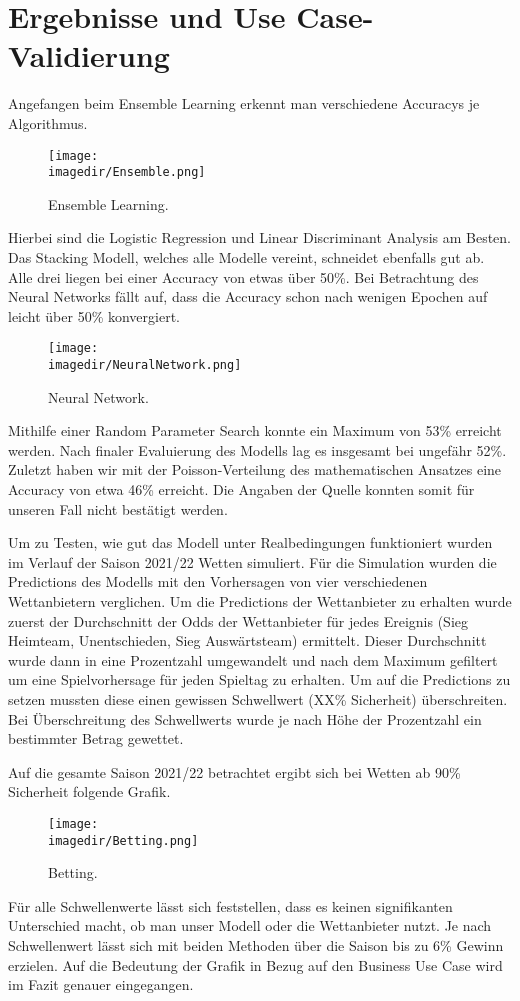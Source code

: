 \section{Ergebnisse und Use Case-Validierung}
Angefangen beim Ensemble Learning erkennt man verschiedene Accuracys je Algorithmus. 
\begin{figure}[H]
	
	\centering
	\texttt{[image: \\imagedir/Ensemble.png]}
	\captionsetup{format=hang}
	\caption[Ensemble Learning]{\label{fig:test}Ensemble Learning.}
	
\end{figure}
Hierbei sind die Logistic Regression und Linear Discriminant Analysis am Besten. Das Stacking Modell, welches alle Modelle vereint, schneidet ebenfalls gut ab. Alle drei liegen bei einer Accuracy von etwas über 50\%. Bei Betrachtung des Neural Networks fällt auf, dass die Accuracy schon nach wenigen Epochen auf leicht über 50\% konvergiert.
\begin{figure}[H]
	
	\centering
	\texttt{[image: \\imagedir/NeuralNetwork.png]}
	\captionsetup{format=hang}
	\caption[Neural Network]{\label{fig:test}Neural Network.}
	
\end{figure}
Mithilfe einer Random Parameter Search konnte ein Maximum von 53\% erreicht werden. Nach finaler Evaluierung des Modells lag es insgesamt bei ungefähr 52\%. Zuletzt haben wir mit der Poisson-Verteilung des mathematischen Ansatzes eine Accuracy von
etwa 46\% erreicht. Die Angaben der Quelle konnten somit für unseren Fall nicht bestätigt werden.

Um zu Testen, wie gut das Modell unter Realbedingungen funktioniert
wurden im Verlauf der Saison 2021/22 Wetten simuliert. Für die
Simulation wurden die Predictions des Modells mit den Vorhersagen von
vier verschiedenen Wettanbietern verglichen. Um die Predictions der
Wettanbieter zu erhalten wurde zuerst der Durchschnitt der Odds der
Wettanbieter für jedes Ereignis (Sieg Heimteam, Unentschieden, Sieg Auswärtsteam)
ermittelt. Dieser Durchschnitt wurde dann in eine Prozentzahl umgewandelt
und nach dem Maximum gefiltert um eine Spielvorhersage für jeden Spieltag zu erhalten.
Um auf die Predictions zu setzen mussten diese einen gewissen Schwellwert (XX\% Sicherheit) überschreiten.
Bei Überschreitung des Schwellwerts wurde je nach Höhe der Prozentzahl ein bestimmter Betrag gewettet.

Auf die gesamte Saison 2021/22 betrachtet ergibt sich bei Wetten ab 90\% Sicherheit folgende Grafik.
\begin{figure}[H]
	
	\centering
	\texttt{[image: \\imagedir/Betting.png]}
	\captionsetup{format=hang}
	\caption[Ensemble-Learning]{\label{fig:test}Betting.}
	
\end{figure}
Für alle Schwellenwerte lässt sich feststellen, dass es keinen signifikanten Unterschied macht, ob man unser Modell oder die Wettanbieter nutzt. Je nach Schwellenwert lässt sich mit beiden Methoden über die Saison bis zu 6\% Gewinn erzielen. Auf die Bedeutung der Grafik in Bezug auf den Business Use Case wird im Fazit genauer eingegangen.
